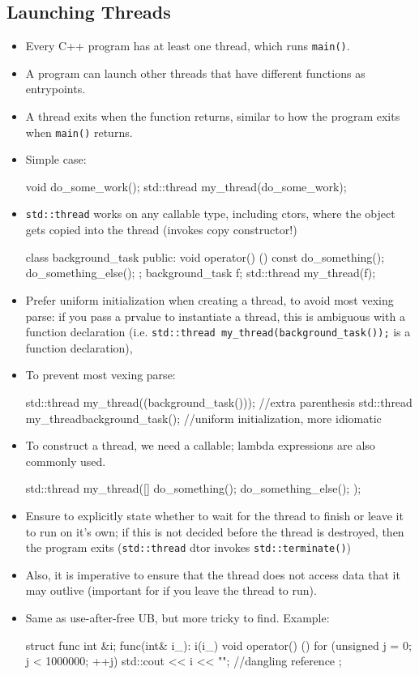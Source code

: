 \documentclass[11pt, a4paper]{article}
\theoremstyle{definition}
\theoremstyle{remark}
\newcommand{\code}[1]{\lstinline|#1|}
\begin{document}
\subsection{Launching Threads}
\begin{itemize}
    \item Every C++ program has at least one thread, which runs \code{main()}.
    \item A program can launch other threads that have different functions as entrypoints.
    \item A thread exits when the function returns, similar to how the program exits when \code{main()} returns.
    \item Simple case:
\begin{cppcode}
void do_some_work();
std::thread my_thread(do_some_work);
\end{cppcode}
    \item \code{std::thread} works on any callable type, including ctors, where the object gets copied into the thread (invokes copy constructor!)
\begin{cppcode}
class background_task {
public:
    void operator() () const {
        do_something();
        do_something_else();
    }
};
background_task f;
std::thread my_thread(f);
\end{cppcode}
    \item Prefer uniform initialization when creating a thread, to avoid most vexing parse: if you pass a prvalue to instantiate a thread, this is ambiguous with a function declaration (i.e. \code{std::thread my_thread(background_task());} is a function declaration),
    \item To prevent most vexing parse:
\begin{cppcode}
std::thread my_thread((background_task())); //extra parenthesis
std::thread my_thread{background_task()}; //uniform initialization, more idiomatic
\end{cppcode}
    \item To construct a thread, we need a callable; lambda expressions are also commonly used.
\begin{cppcode}
std::thread my_thread([] {
    do_something();
    do_something_else();
});
\end{cppcode}
    \item Ensure to explicitly state whether to wait for the thread to finish or leave it to run on it's own; if this is not decided before the thread is destroyed, then the program exits (\code{std::thread} dtor invokes \code{std::terminate()})
    \item Also, it is imperative to ensure that the thread does not access data that it may outlive (important for if you leave the thread to run).
    \item Same as use-after-free UB, but more tricky to find. Example:
\begin{cppcode}
struct func {
    int &i;
    func(int& i_): i(i_) {}
    void operator() () {
        for (unsigned j = 0; j < 1000000; ++j) std::cout << i << "\n"; //dangling reference
    }
};


\end{cppcode}
\end{itemize}
\end{document}
